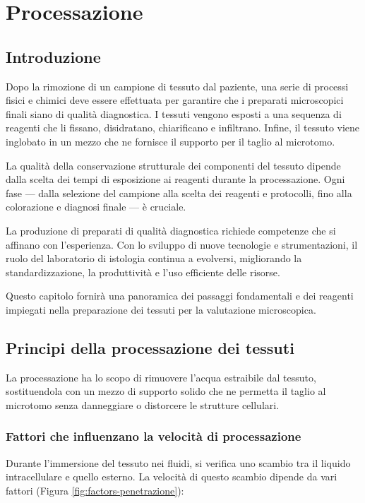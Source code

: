 \chapter{Processazione}

\section{Introduzione}
Dopo la rimozione di un campione di tessuto dal paziente, una serie di processi fisici e chimici deve essere effettuata per garantire che i preparati microscopici finali siano di qualità diagnostica.  
I tessuti vengono esposti a una sequenza di reagenti che li fissano, disidratano, chiarificano e infiltrano. Infine, il tessuto viene inglobato in un mezzo che ne fornisce il supporto per il taglio al microtomo.

La qualità della conservazione strutturale dei componenti del tessuto dipende dalla scelta dei tempi di esposizione ai reagenti durante la processazione. Ogni fase — dalla selezione del campione alla scelta dei reagenti e protocolli, fino alla colorazione e diagnosi finale — è cruciale.

La produzione di preparati di qualità diagnostica richiede competenze che si affinano con l’esperienza. Con lo sviluppo di nuove tecnologie e strumentazioni, il ruolo del laboratorio di istologia continua a evolversi, migliorando la standardizzazione, la produttività e l’uso efficiente delle risorse.  

Questo capitolo fornirà una panoramica dei passaggi fondamentali e dei reagenti impiegati nella preparazione dei tessuti per la valutazione microscopica.



\section{Principi della processazione dei tessuti}
La processazione ha lo scopo di rimuovere l’acqua estraibile dal tessuto, sostituendola con un mezzo di supporto solido che ne permetta il taglio al microtomo senza danneggiare o distorcere le strutture cellulari.

\subsection{Fattori che influenzano la velocità di processazione}
Durante l’immersione del tessuto nei fluidi, si verifica uno scambio tra il liquido intracellulare e quello esterno. La velocità di questo scambio dipende da vari fattori (Figura \ref{fig:factors-penetrazione}):

